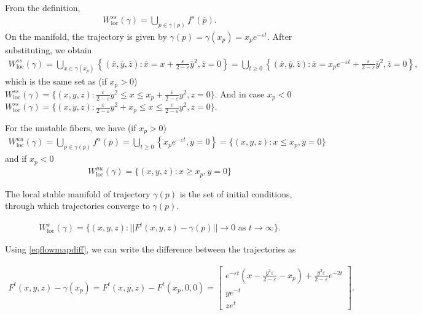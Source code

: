 \begin{solution}[9.5]
\begin{enumerate}
From the definition, 
\begin{align}
W^{ss}_\text{loc}(\gamma) = \bigcup_{\overline{p}\in \gamma(p)} f^s(\overline{p}).
\end{align}
On the manifold, the trajectory is given by $\gamma(p)=\gamma(x_p) = x_p e^{-\varepsilon t}$. After substituting, we obtain
\begin{align}
W^{ss}_\text{loc}(\gamma) = \bigcup_{x\in \gamma(x_p)}\left\{(\overline{x}, \overline{y}, \overline{z}) : \overline{x} = x + \frac{\varepsilon}{2-\varepsilon}\overline{y}^2 , \overline{z} = 0\right\}
 =\bigcup_{t\geq 0} \left\{(\overline{x}, \overline{y}, \overline{z}) : \overline{x}= x_pe^{-\varepsilon t} + \frac{\varepsilon}{2-\varepsilon}\overline{y}^2, \overline{z}=0 \right\},
 \end{align}
 which is the same set as (if $x_p>0$) $W^{ss}_\text{loc}(\gamma) = \{(x,y,z): \frac{\varepsilon}{2-\varepsilon}y^2 \leq x \leq x_p +\frac{\varepsilon}{2-\varepsilon}y^2 , z=0\}$. And in case $x_p<0$ $W^{ss}_\text{loc}(\gamma) = \{(x,y,z): \frac{\varepsilon}{2-\varepsilon}y^2 +x_p \leq x \leq \frac{\varepsilon}{2-\varepsilon}y^2 , z=0\}$.
 
For the unstable fibers, we have (if $x_p>0$)
\begin{align}
W^{uu}_\text{loc}(\gamma) = \bigcup_{\overline{p}\in \gamma(p)} f^u(\overline{p}) = \bigcup_{t\geq 0} \left\{ x_pe^{-\varepsilon t}, y= 0 \right\} = \{(x,y,z): x \leq x_p, y=0\}
\end{align}
and if $x_p<0$
\begin{align}
W^{uu}_\text{loc}(\gamma) = \{(x,y,z): x \geq x_p, y=0\}
\end{align}


The local stable manifold of trajectory $\gamma(p)$ is the set of initial conditions, through which trajectories converge to $\gamma(p)$.

\begin{align}
W^s_\text{loc}(\gamma) = \{ (x,y,z): ||F^t(x,y,z) - \gamma(p)|| \to 0 \text{ as } t\to \infty\}. 
\end{align}

Using \eqref{eqflowmapdiff}, we can write the difference between the trajectories as

\begin{align}
F^t(x,y,z) - \gamma(x_p)= F^t(x,y,z) - F^t(x_p, 0, 0) = \begin{bmatrix}
e^{-\varepsilon t} \left(x - \frac{y^2 \varepsilon }{2-\varepsilon} - x_p \right) + \frac{y^2 \varepsilon }{2-\varepsilon}e^{-2t}\\
y e^{-t} \\
z e^{t}
\end{bmatrix}.
\end{align}


\end{enumerate}
\end{solution}
